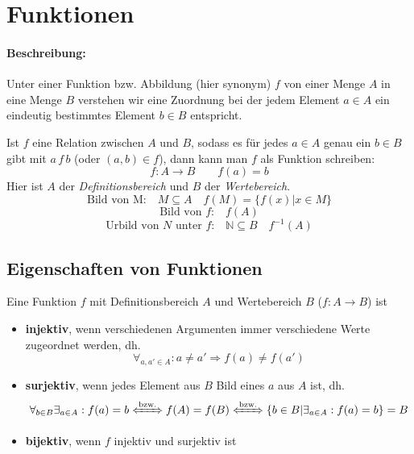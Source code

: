 %

\section{Funktionen}
\paragraph{Beschreibung:}Unter einer Funktion bzw. Abbildung (hier synonym) $f$ von einer Menge $A$ in eine Menge $B$ verstehen wir eine Zuordnung bei der jedem Element $a\in A$ ein eindeutig bestimmtes Element $b\in B$ entspricht.
\begin{defi}[Funktionen]
Ist $f$ eine Relation zwischen $A$ und $B$, sodass es für jedes $a\in A$ genau ein $b\in B$ gibt mit $a\, f\, b$ (oder $(a,b)\in f$), dann kann man $f$ als Funktion schreiben:
\[
f:A\rightarrow B \qquad f(a)=b
\]
Hier ist $A$ der \emph{Definitionsbereich} und $B$ der \emph{Wertebereich}.
\[
\text{Bild von M:} \quad M\subseteq A \quad f(M) = \{f(x) | x\in M\}
\]
\[
\text{Bild von $f$:} \quad f(A)
\]
\[
\text{Urbild von $N$ unter $f$:} \quad \mathbb{N}\subseteq B \quad f^{-1}(A)
\]
\end{defi}
%
\subsection{Eigenschaften von Funktionen}
Eine Funktion $f$ mit Definitionsbereich $A$ und Wertebereich $B$ ($f:A\rightarrow B$) ist
\begin{itemize}
\item \textbf{injektiv}, wenn verschiedenen Argumenten immer verschiedene Werte zugeordnet werden, dh.
\[
\forall_{a,a'\in A}: a\neq a' \Rightarrow f(a)\neq f(a')
\]
\item \textbf{surjektiv}, wenn jedes Element aus $B$ Bild eines $a$ aus $A$ ist, dh.
\[
\forall_{b\in B}\exists_{a\in A}: f(a)=b \xLeftrightarrow{\text{bzw.}} f(A)=f(B) \xLeftrightarrow{\text{bzw.}} \{b\in B | \exists_{a\in A}: f(a)=b\}=B
\]
\item \textbf{bijektiv}, wenn $f$ injektiv und surjektiv ist
\end{itemize}

